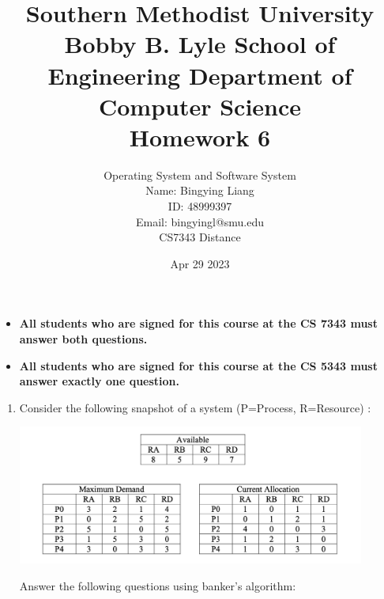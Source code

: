 \documentclass[12pt]{article}
\title{Southern Methodist University \\
Bobby B. Lyle School of Engineering Department of Computer Science \\
Homework 6
}
\author{Operating System and Software System \\
Name: Bingying Liang 
\\ ID: 48999397\\ 
Email: bingyingl@smu.edu \\ 
CS7343 Distance}
\date{Apr 29 2023}
\newenvironment{sol}[1][Solution]{\begin{trivlist}\item[\hskip\labelsep {\bfseries #1:}]}{\end{trivlist}}
\begin{document}
\maketitle
\begin{itemize}
    \item\textbf{All students who are signed for this course at the CS 7343 must answer both questions.}
    \item \textbf{All students who are signed for this course at the CS 5343 must answer exactly one question.}
\end{itemize}

\begin{enumerate}
    \item Consider the following snapshot of a system (P=Process, R=Resource) :
    \begin{center}
        \includegraphics[width=0.9\textwidth]{p1.png}
    \end{center}
    Answer the following questions using banker’s algorithm:
\end{enumerate}
\end{document}
